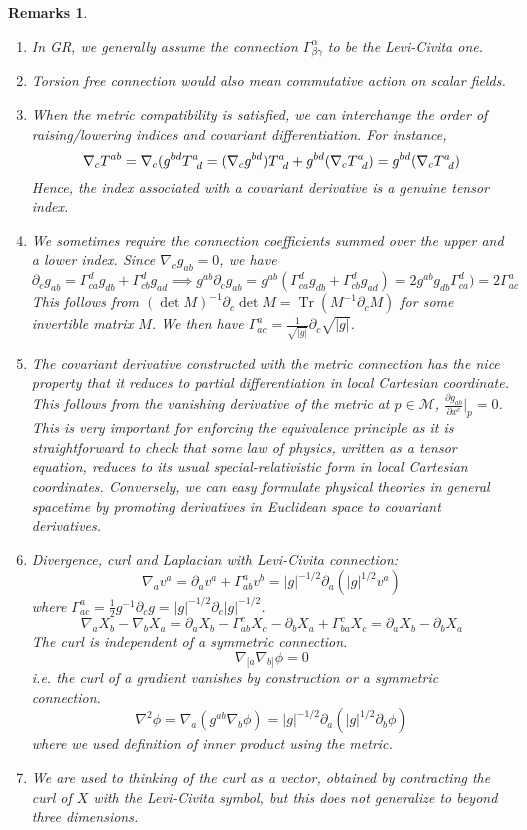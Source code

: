 \documentclass[a4paper]{article}
\DeclareMathOperator{\Tr}{Tr}
\newtheorem{remarks}{Remarks}[section]
\theoremstyle{new}
\begin{document}
\begin{remarks}\leavevmode
\begin{enumerate}
\item In GR, we generally assume the connection $\Gamma_{\beta\gamma}^\alpha$ to be the Levi-Civita one.
\item Torsion free connection would also mean commutative action on scalar fields.
\item When the metric compatibility is satisfied, we can interchange the order of raising/lowering indices and covariant differentiation. For instance,
$$\nabla_cT^{ab}=\nabla_c(g^{bd}\tensor*{T}{*_{}^{a}_{d}}=(\nabla_cg^{bd})\tensor*{T}{*_{}^{a}_{d}}+g^{bd}(\nabla_c\tensor*{T}{*_{}^{a}_{d}})=g^{bd}(\nabla_c\tensor*{T}{*_{}^{a}_{d}})$$
Hence, the index associated with a covariant derivative is a genuine tensor index.
\item We sometimes require the connection coefficients summed over the upper and a lower index. Since $\nabla_cg_{ab}=0$, we have
$$\partial_cg_{ab}=\Gamma^d_{ca}g_{db}+\Gamma^d_{cb}g_{ad}\implies g^{ab}\partial_cg_{ab}=g^{ab}(\Gamma^d_{ca}g_{db}+\Gamma^d_{cb}g_{ad})=2g^{ab}g_{db}\Gamma^d_{ca})=2\Gamma^a_{ac}$$
This follows from $(\det M)^{-1}\partial_c\det M=\Tr(M^{-1}\partial_cM)$ for some invertible matrix $M$. We then have $\Gamma_{ac}^a=\frac{1}{\sqrt{|g|}}\partial_c\sqrt{|g|}$. 
\item The covariant derivative constructed with the metric connection has the nice property that it reduces to partial differentiation in local Cartesian coordinate. This follows from the vanishing derivative of the metric at $p\in\mathcal{M}$, $\frac{\partial g_{ab}}{\partial x^c}|_p=0$. This is very important for enforcing the equivalence principle as it is straightforward to check that some law of physics, written as a tensor equation, reduces to its usual special-relativistic form in local Cartesian coordinates. Conversely, we can easy formulate physical theories in general spacetime by promoting derivatives in Euclidean space to covariant derivatives.
\item Divergence, curl and Laplacian with Levi-Civita connection:
$$\nabla_av^a=\partial_av^a+\Gamma_{ab}^av^b=|g|^{-1/2}\partial_a(|g|^{1/2}v^a)$$
where $\Gamma_{ac}^a=\frac{1}{2}g^{-1}\partial_cg=|g|^{-1/2}\partial_c|g|^{-1/2}$.
$$\nabla_aX_b-\nabla_bX_a=\partial_aX_b-\Gamma_{ab}^cX_c-\partial_bX_a+\Gamma_{ba}^cX_c=\partial_aX_b-\partial_bX_a$$
The curl is independent of a symmetric connection.
$$\nabla_{[a}\nabla_{b]}\phi=0$$
i.e. the curl of a gradient vanishes by construction or a symmetric connection.
$$\nabla^2\phi=\nabla_a(g^{ab}\nabla_b\phi)=|g|^{-1/2}\partial_a(|g|^{1/2}\partial_b\phi)$$
where we used definition of inner product using the metric.
\item We are used to thinking of the curl as a vector, obtained by contracting the curl of $X$ with the Levi-Civita symbol, but this does not generalize to beyond three dimensions.
\end{enumerate}
\end{remarks}
\newpage
\end{document}
